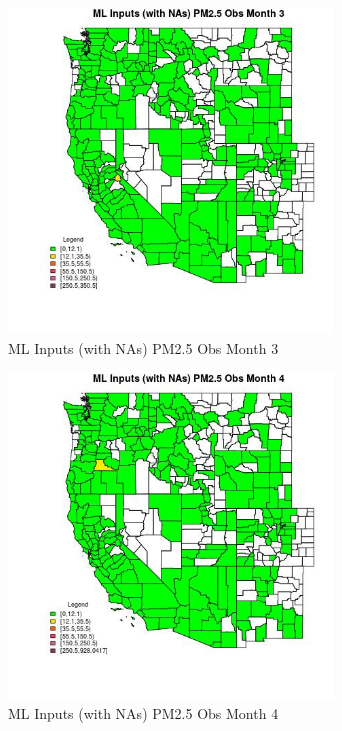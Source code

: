 \begin{figure} 
\centering  
\includegraphics[width=0.77\textwidth]{Code_Outputs/Report_ML_input_PM25_Step4_part_f_de_duplicated_aveswNAs_CountyPM25_ObsmedianMonth3.jpg} 
\caption{\label{fig:Report_ML_input_PM25_Step4_part_f_de_duplicated_aveswNAsCountyPM25_ObsmedianMonth3}ML Inputs (with NAs) PM2.5 Obs Month 3} 
\end{figure} 
 

\begin{figure} 
\centering  
\includegraphics[width=0.77\textwidth]{Code_Outputs/Report_ML_input_PM25_Step4_part_f_de_duplicated_aveswNAs_CountyPM25_ObsmedianMonth4.jpg} 
\caption{\label{fig:Report_ML_input_PM25_Step4_part_f_de_duplicated_aveswNAsCountyPM25_ObsmedianMonth4}ML Inputs (with NAs) PM2.5 Obs Month 4} 
\end{figure} 
 


